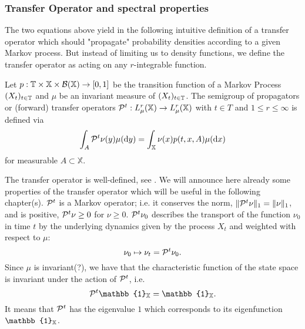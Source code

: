 \subsubsection*{Transfer Operator and spectral properties}
The two equations above yield in the following intuitive definition of a transfer operator which should "propagate" probability densities according to a given Markov process. But instead of limiting us to density functions, we define the transfer operator as acting on any $r$-integrable function.

\begin{defi}
Let $p: \mathbb{T} \times \mathbb{X} \times \mathcal{B}(\mathbb{X}) \rightarrow [0,1]$ be the transition function of a Markov Process $(X_t)_{t\in\mathbb{T}}$ and $\mu$ be an invariant measure of $(X_t)_{t\in\mathbb{T}}$.
The semigroup of propagators or (forward) transfer operators $\mathcal{P}^t : L_\mu^r (\mathbb{X}) \rightarrow L_\mu^r (\mathbb{X})$ with $t \in T$ and $1\leq r \leq \infty$ is defined via
\begin{equation}
\int_A \mathcal{P}^t \nu(y) \mu(\mathop{}\!\mathrm{d} y) = \int_\mathbb{X} \nu(x)p(t,x,A) \mu(\mathop{}\!\mathrm{d} x)
\end{equation}
for measurable $A \subset \mathbb{X}.$ 
\end{defi}
The transfer operator is well-defined, see \cite{huisinga2001metastability}.
We will announce here already some properties of the transfer operator which will be useful in the following chapter(s).
$\mathcal{P}^t$ is a Markov operator; i.e. it conserves the norm, $\Vert \mathcal{P}^t\nu \Vert_1 = \Vert \nu \Vert_1$, and is positive, $\mathcal{P}^t \nu \geq 0$ for $\nu \geq 0$. 
$\mathcal{P}^t \nu_0$ describes the transport of the function $\nu_0$ in time $t$ by the underlying dynamics given by the process $X_t$ and weighted with respect to $\mu$:
\begin{equation}
\nu_0 \mapsto \nu_t = \mathcal{P}^t \nu_0.
\end{equation}
Since $\mu$ is invariant(?), we have that the characteristic function of the state space is invariant under the action of $\mathcal{P}^t$, i.e.
\begin{equation}
\Pcal^t \mathbb{1}_\X = \mathbb{1}_\X.
\end{equation}
It means that $\mathcal{P}^t$ has the eigenvalue $1$ which corresponds to its eigenfunction $\mathbb{1}_\X$.
\\

